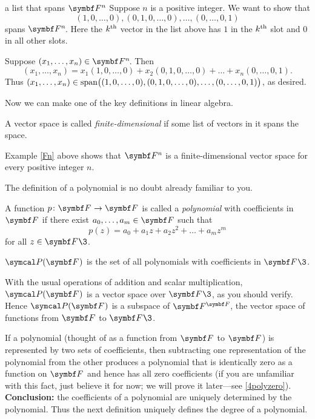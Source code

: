 \begin{example}[Fn]{a list that spans\/ $\F{n}$}
Suppose $n$ is a positive integer. We want to show that
\[
(1, 0, \dots, 0), (0, 1, 0, \dots, 0), \dots, (0, \dots, 0, 1)
\]
spans $\FF{n}$. Here the $k^{\text{{th}}}$ vector in the list above has $1$ in the $k^{\text{{th}}}$ slot and $0$ in all other slots.

Suppose $(x_1, \dots, x_n) \in \FF{n}$. Then
\[
(x_1, \dots, x_n) = x_1 (1, 0, \dots, 0) + x_2 (0, 1, 0, \dots, 0) + \dots + x_n (0, \dots, 0, 1).
\]
Thus $(x_1, \dots, x_n) \in \operatorname{span} \bigl((1, 0, \dots, 0), (0, 1, 0, \dots, 0), \dots, (0, \dots, 0, 1)\bigr)$, as desired.
\end{example}

Now we can make one of the key definitions in linear algebra.

{A vector space is called \emph{finite-dimensional} if some list of vectors in it spans the
space.}


Example \ref{Fn} above shows that $\F{n}$ is a finite-dimensional vector space for every positive integer $n$.

The definition of a polynomial is no doubt already familiar to you.

{\begin{Itemize}
\item
A function $p \colon \F{} \to \F{}$  is called a \emph{polynomial} with
coefficients in $\F{}$ if there exist $a_0, \dots, a_m \in \F{}$ such that
\[
p(z) = a_0 + a_1 z + a_2 z^2 + \dots + a_m z^m
\]
for all $z \in \F{}\3$.
\item
$\P(\F{})$ is the set of all polynomials with coefficients in $\F{}\3$.
\end{Itemize}}

With the usual operations of addition and scalar multiplication, $\P(\F{})$ is a vector space over $\F{}\3$, as you should verify. Hence $\P(\F{})$ is a subspace of $\FF{\F{}}$, the vector space of functions from $\F{}$ to $\F{}\3$.

If a polynomial (thought of as a function from $\F{}$ to $\F{}$) is represented by two sets of coefficients, then subtracting one representation of the polynomial from the other produces a polynomial that is identically zero as a function on $\F{}$ and hence has all zero coefficients (if you are unfamiliar with this fact, just believe it for now;
we will prove it later---see \ref{4polyzero}). \textbf{Conclusion:} the coefficients of a polynomial are uniquely determined by the polynomial. Thus the next definition uniquely defines the degree of a polynomial.

